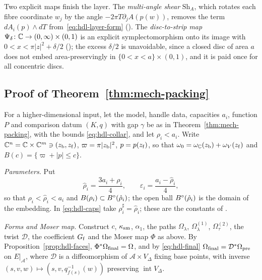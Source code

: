 Two explicit maps finish the layer. The \emph{multi-angle shear} $\mathrm{Sh}_A$, which rotates each fibre coordinate
$w_j$ by the angle $-2\pi T\partial_jA(p(w))$, removes the term $dA_i(p)\wedge dT$ from~\eqref{eq:hdl-layer-form}
(). The \emph{disc-to-strip map} $\Psi_\delta\colon\mathbb{C}\to(0,\infty)\times(0,1)$ is an explicit
symplectomorphism onto its image with $0<x<\pi|z|^2+\delta/2$ (); the excess $\delta/2$
is unavoidable, since a closed disc of area $a$ does not embed area-preservingly in $\{0<x<a\}\times(0,1)$, and it is paid
once for all concentric discs.

\subsection{Proof of Theorem~\ref{thm:mech-packing}}\label{sec:hdl-proof}

For a higher-dimensional input, let the model, handle data, capacities $a_i$, function $P$ and comparison datum $(K,q)$ with gap $\gamma$ be as in
Theorem~\ref{thm:mech-packing}, with the bounds \eqref{eq:hdl-collar}, and let
$\rho_i<a_i$. Write $\mathbb{C}^n=\mathbb{C}\times\mathbb{C}^m\ni(z_{\rm b},z_{\rm f})$, $\varpi=\pi|z_{\rm b}|^2$, $p=p(z_{\rm f})$, so that
$\omega_0=\omega_{\mathbb{C}}(z_{\rm b})+\omega_V(z_{\rm f})$ and $B(c)=\{\varpi+|p|\le c\}$.

\emph{Parameters.} Put
\[
 \hat\rho_i=\frac{3a_i+\rho_i}4,\qquad \varepsilon_i=\frac{a_i-\hat\rho_i}4,
\]
so that $\rho_i<\hat\rho_i<a_i$ and $B(\rho_i)\subset B^{\circ}(\hat\rho_i)$; the open ball $B^{\circ}(\hat\rho_i)$ is the domain of
the embedding. In \eqref{eq:hdl-caps} take $\rho_i^\sharp=\hat\rho_i$; these are the constants of
.

\emph{Forms and Moser map.} Construct $c$, $\kappa_{\rm sm}$, $\alpha_1$, the paths $\Omega_\lambda$, $\Omega^{(1)}_\lambda$,
$\Omega^{(2)}_\tau$, the twist $\mathcal D$, the coefficient $G_{\rm f}$ and the Moser map $\Phi$ as above. By
Proposition~\ref{prop:hdl-faces}, $\Phi^*\Omega_{\rm final}=\Omega$, and by \eqref{eq:hdl-final}
$\Omega_{\rm final}=\mathcal D^*\Omega_{\rm pre}$ on $E|_{\mathcal A}$, where $\mathcal D$ is a diffeomorphism of
$\mathcal A\times V_\Delta$ fixing base points, with inverse $(s,v,w)\mapsto(s,v,q_{f(s)}^{-1}(w))$ preserving
$\operatorname{int}V_\Delta$.

